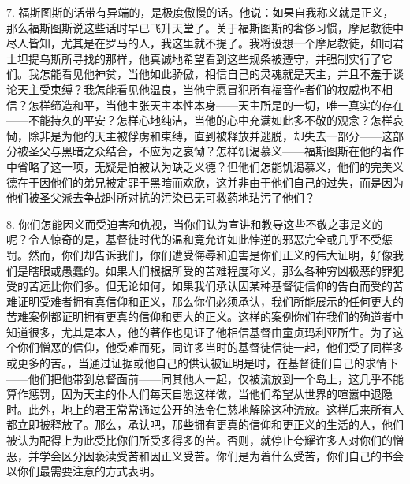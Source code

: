 7. 福斯图斯的话带有异端的，是极度傲慢的话。他说：如果自我称义就是正义，那么福斯图斯说这些话时早已飞升天堂了。关于福斯图斯的奢侈习惯，摩尼教徒中尽人皆知，尤其是在罗马的人，我这里就不提了。我将设想一个摩尼教徒，如同君士坦提乌斯所寻找的那样，他真诚地希望看到这些规条被遵守，并强制实行了它们。我怎能看见他神贫，当他如此骄傲，相信自己的灵魂就是天主，并且不羞于谈论天主受束缚？我怎能看见他温良，当他宁愿冒犯所有福音作者们的权威也不相信？怎样缔造和平，当他主张天主本性本身——天主所是的一切，唯一真实的存在——不能持久的平安？怎样心地纯洁，当他的心中充满如此多不敬的观念？怎样哀恸，除非是为他的天主被俘虏和束缚，直到被释放并逃脱，却失去一部分——这部分被圣父与黑暗之众结合，不应为之哀恸？怎样饥渴慕义——福斯图斯在他的著作中省略了这一项，无疑是怕被认为缺乏义德？但他们怎能饥渴慕义，他们的完美义德在于因他们的弟兄被定罪于黑暗而欢欣，这并非由于他们自己的过失，而是因为他们被圣父派去争战时所对抗的污染已无可救药地玷污了他们？\par

8. 你们怎能因义而受迫害和仇视，当你们认为宣讲和教导这些不敬之事是义的呢？令人惊奇的是，基督徒时代的温和竟允许如此悖逆的邪恶完全或几乎不受惩罚。然而，你们却告诉我们，你们遭受侮辱和迫害是你们正义的伟大证明，好像我们是瞎眼或愚蠢的。如果人们根据所受的苦难程度称义，那么各种穷凶极恶的罪犯受的苦远比你们多。但无论如何，如果我们承认因某种基督徒信仰的告白而受的苦难证明受难者拥有真信仰和正义，那么你们必须承认，我们所能展示的任何更大的苦难案例都证明拥有更真的信仰和更大的正义。这样的案例你们在我们的殉道者中知道很多，尤其是本人，他的著作也见证了他相信基督由童贞玛利亚所生。为了这个你们憎恶的信仰，他受难而死，同许多当时的基督徒信徒一起，他们受了同样多或更多的苦。，当通过证据或他自己的供认被证明是时，在基督徒们自己的求情下——他们把他带到总督面前——同其他人一起，仅被流放到一个岛上，这几乎不能算作惩罚，因为天主的仆人们每天自愿这样做，当他们希望从世界的喧嚣中退隐时。此外，地上的君王常常通过公开的法令仁慈地解除这种流放。这样后来所有人都立即被释放了。那么，承认吧，那些拥有更真的信仰和更正义的生活的人，他们被认为配得上为此受比你们所受多得多的苦。否则，就停止夸耀许多人对你们的憎恶，并学会区分因亵渎受苦和因正义受苦。你们是为着什么受苦，你们自己的书会以你们最需要注意的方式表明。\par

